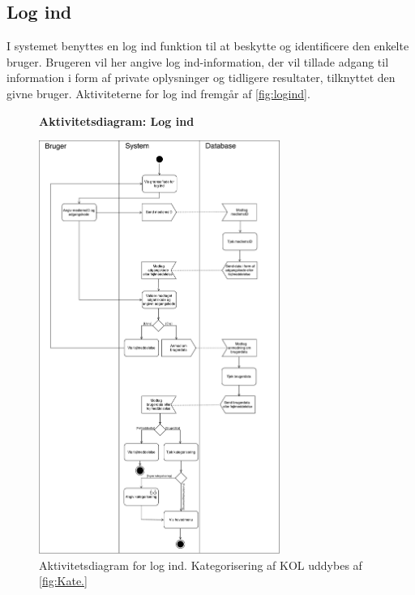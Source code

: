 \subsection*{Log ind}
I systemet benyttes en log ind funktion til at beskytte og identificere den enkelte bruger. Brugeren vil her angive log ind-information, der vil tillade adgang til information i form af private oplysninger og tidligere resultater, tilknyttet den givne bruger. Aktiviteterne for log ind fremgår af \autoref{fig:logind}.    


\begin{figure} [H]
\centering
\textbf{Aktivitetsdiagram: Log ind}\par\medskip
\includegraphics[width=0.7\textwidth]{figures/aktivitetsdiagram/Logind}
\caption{Aktivitetsdiagram for log ind. Kategorisering af KOL uddybes af \autoref{fig:Kate.}}
\label{fig:logind}
\end{figure}

